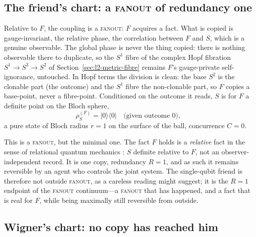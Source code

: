 \subsection{The friend's chart: a \textsc{fanout} of redundancy one}
\label{sec:wf-friend}

Relative to $F$, the coupling is a \textsc{fanout}: $F$ acquires a fact. What is
copied is gauge-invariant, the relative phase, the correlation between $F$ and
$S$, which is a genuine observable. The global phase is never the thing copied:
there is nothing observable there to duplicate, so the $S^{1}$ fibre of the
complex Hopf fibration $S^{1}\to S^{3}\to S^{2}$ of
Section~\ref{sec:l2-metric-fibre} remains $F$'s gauge-private self-ignorance,
untouched. In Hopf terms the division is clean: the base $S^{2}$ is the clonable
part (the outcome) and the $S^{1}$ fibre the non-clonable part, so $F$ copies a
base-point, never a fibre-point. Conditioned on the outcome it reads, $S$ is for
$F$ a definite point on the Bloch sphere,
\begin{equation}
  \rho_{S}^{(F)}=\lvert 0\rangle\langle 0\rvert
  \quad\text{(given outcome }0\text{)},
\end{equation}
a pure state of Bloch radius $r=1$ on the surface of the ball, concurrence $C=0$.

This is a \textsc{fanout}, but the minimal one. The fact $F$ holds is a
\emph{relative} fact in the sense of relational quantum mechanics
\autocite{Rovelli1996a}: $S$ definite relative to $F$, not an observer-independent
record. It is one copy, redundancy $R=1$, and as such it remains reversible by an
agent who controls the joint system. The single-qubit friend is therefore not
outside \textsc{fanout}, as a careless reading might suggest; it is the $R=1$
endpoint of the \textsc{fanout} continuum---a \textsc{fanout} that has happened,
and a fact that is real for $F$, while being maximally still reversible from
outside.

\subsection{Wigner's chart: no copy has reached him}
\label{sec:wf-wigner}

